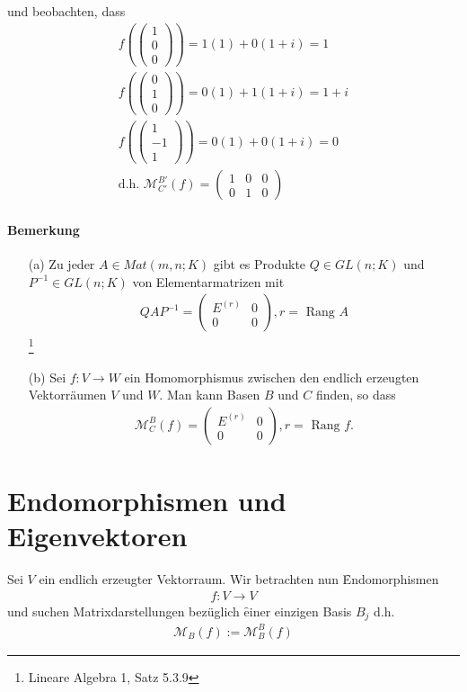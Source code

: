 und beobachten, dass
\begin{align}
f(\begin{pmatrix}1 \\ 0 \\ 0\end{pmatrix}) = 1(1) + 0(1+i) = 1 \\
f(\begin{pmatrix}0 \\ 1 \\ 0\end{pmatrix}) = 0(1) + 1(1+i) = 1 + i\\
f(\begin{pmatrix}1 \\ -1 \\ 1\end{pmatrix}) = 0(1) + 0(1+i) = 0\\
\text{d.h. } \mathcal{M}_{C'}^{B'} (f) = \begin{pmatrix} 1 & 0 & 0 \\ 0 & 1 & 0 \end{pmatrix}
\end{align}

\paragraph{Bemerkung}
\begin{itemize}
\item[(a)] Zu jeder $A \in Mat(m,n;K)$ gibt es Produkte $Q \in GL(n;K)$ und $P^{-1} \in GL(n;K)$ von Elementarmatrizen mit
\begin{align}
Q A P^{-1} = \begin{pmatrix} E^{(r)} & 0 \\ 0 & 0\end{pmatrix}, r = \text{ Rang } A
\end{align}
\footnote{Lineare Algebra 1, Satz 5.3.9}

\item[(b)] Sei $f: V \rightarrow W$ ein Homomorphismus zwischen den endlich erzeugten Vektorräumen $V$ und $W$. Man kann Basen $B$ und $C$ finden, so dass
\begin{align}
\mathcal{M}_{C}^{B}(f) = \begin{pmatrix} E^{(r)} & 0 \\ 0 & 0\end{pmatrix}, r = \text{ Rang } f.
\end{align}
\end{itemize}

\section{Endomorphismen und Eigenvektoren} %
Sei $V$ ein endlich erzeugter Vektorraum. Wir betrachten nun \f{Endomorphismen}
\begin{align}
f: V \rightarrow  V
\end{align}
und suchen Matrixdarstellungen bezüglich \f{einer einzigen Basis} $B_j$ d.h.
\begin{align}
\mathcal{M}_{B} (f) := \mathcal{M}_{B}^{B} (f)
\end{align}

